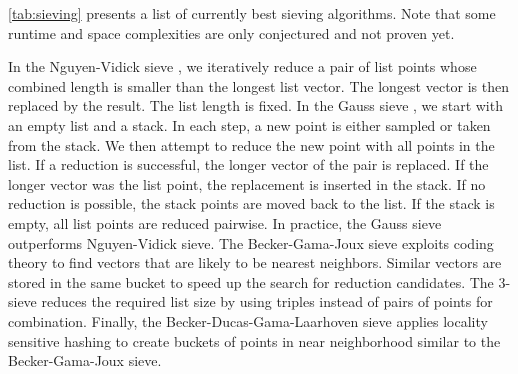 \cref{tab:sieving} presents a list of currently best sieving algorithms. Note that some runtime and space complexities are only conjectured and not proven yet.

In the Nguyen-Vidick sieve \cite{NV08}, we iteratively reduce a pair of list points whose combined length is smaller than the longest list vector. The longest vector is then replaced by the result. The list length is fixed.
In the Gauss sieve \cite{MV10}, we start with an empty list and a stack. In each step, a new point is either sampled or taken from the stack. We then attempt to reduce the new point with all points in the list. If a reduction is successful, the longer vector of the pair is replaced. If the longer vector was the list point, the replacement is inserted in the stack. If no reduction is possible, the stack points are moved back to the list. If the stack is empty, all list points are reduced pairwise. In practice, the Gauss sieve outperforms Nguyen-Vidick sieve.
The Becker-Gama-Joux sieve \cite{BGJ15} exploits coding theory to find vectors that are likely to be nearest neighbors. Similar vectors are stored in the same bucket to speed up the search for reduction candidates.
The 3-sieve \cite{BLS16, HK17} reduces the required list size by using triples instead of pairs of points for combination.
Finally, the Becker-Ducas-Gama-Laarhoven sieve \cite{BDGL16} applies locality sensitive hashing to create buckets of points in near neighborhood similar to the Becker-Gama-Joux sieve. %


















